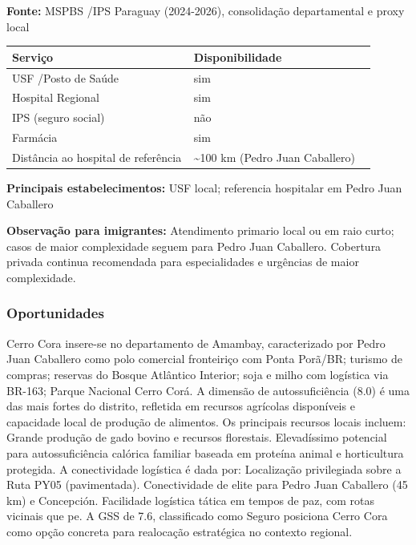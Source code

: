 \textbf{Fonte:} MSPBS /\allowbreak  IPS Paraguay (2024-2026), consolidação
departamental e proxy local

{\def\LTcaptype{none} %
\begin{longtable}{@{}>{\raggedright\arraybackslash}p{0.45\linewidth} >{\raggedright\arraybackslash}p{0.45\linewidth}@{}}
\toprule\noalign{}
Serviço & Disponibilidade \\
\midrule\noalign{}
\endhead
\bottomrule\noalign{}
\endlastfoot
USF /\allowbreak  Posto de Saúde & sim \\
Hospital Regional & sim \\
IPS (seguro social) & não \\
Farmácia & sim \\
Distância ao hospital de referência & \textasciitilde100 km (Pedro Juan
Caballero) \\
\end{longtable}
}

\textbf{Principais estabelecimentos:} USF local; referencia hospitalar
em Pedro Juan Caballero

\textbf{Observação para imigrantes:} Atendimento primario local ou em
raio curto; casos de maior complexidade seguem para Pedro Juan
Caballero. Cobertura privada continua recomendada para especialidades e
urgências de maior complexidade.
\newpage

\subsubsection*{Oportunidades}\label{oport-cerro-cora-1306}
Cerro Cora insere-se no departamento de Amambay, caracterizado por Pedro Juan Caballero como polo comercial fronteiriço com Ponta Porã/BR; turismo de compras; reservas do Bosque Atlântico Interior; soja e milho com logística via BR-163; Parque Nacional Cerro Corá. A dimensão de autossuficiência (8.0) é uma das mais fortes do distrito, refletida em recursos agrícolas disponíveis e capacidade local de produção de alimentos. Os principais recursos locais incluem: Grande produção de gado bovino e recursos florestais. Elevadíssimo potencial para autossuficiência calórica familiar baseada em proteína animal e horticultura protegida. A conectividade logística é dada por: Localização privilegiada sobre a Ruta PY05 (pavimentada). Conectividade de elite para Pedro Juan Caballero (45 km) e Concepción. Facilidade logística tática em tempos de paz, com rotas vicinais que pe. A GSS de 7.6, classificado como Seguro posiciona Cerro Cora como opção concreta para realocação estratégica no contexto regional.


